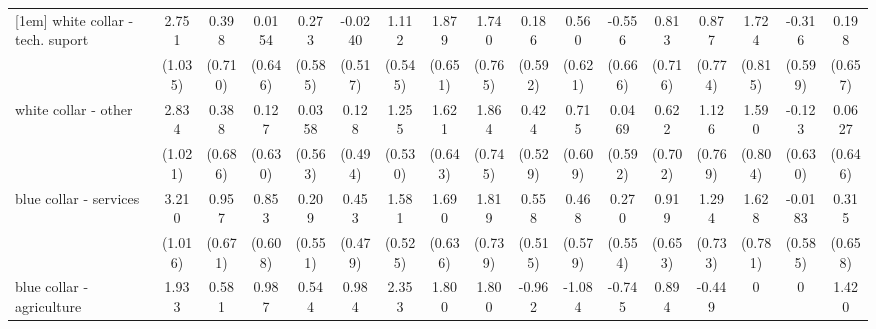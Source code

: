 {\begin{tabular}{l*{16}{c}}
[1em]
white collar - tech. suport&       2.751\sym{**} &       0.398         &      0.0154         &       0.273         &     -0.0240         &       1.112\sym{*}  &       1.879\sym{**} &       1.740\sym{*}  &       0.186         &       0.560         &      -0.556         &       0.813         &       0.877         &       1.724\sym{*}  &      -0.316         &       0.198         \\
                    &     (1.035)         &     (0.710)         &     (0.646)         &     (0.585)         &     (0.517)         &     (0.545)         &     (0.651)         &     (0.765)         &     (0.592)         &     (0.621)         &     (0.666)         &     (0.716)         &     (0.774)         &     (0.815)         &     (0.599)         &     (0.657)         \\
[1em]
white collar - other&       2.834\sym{**} &       0.388         &       0.127         &      0.0358         &       0.128         &       1.255\sym{*}  &       1.621\sym{*}  &       1.864\sym{*}  &       0.424         &       0.715         &      0.0469         &       0.622         &       1.126         &       1.590\sym{*}  &      -0.123         &      0.0627         \\
                    &     (1.021)         &     (0.686)         &     (0.630)         &     (0.563)         &     (0.494)         &     (0.530)         &     (0.643)         &     (0.745)         &     (0.529)         &     (0.609)         &     (0.592)         &     (0.702)         &     (0.769)         &     (0.804)         &     (0.630)         &     (0.646)         \\
[1em]
blue collar - services&       3.210\sym{**} &       0.957         &       0.853         &       0.209         &       0.453         &       1.581\sym{**} &       1.690\sym{**} &       1.819\sym{*}  &       0.558         &       0.468         &       0.270         &       0.919         &       1.294         &       1.628\sym{*}  &     -0.0183         &       0.315         \\
                    &     (1.016)         &     (0.671)         &     (0.608)         &     (0.551)         &     (0.479)         &     (0.525)         &     (0.636)         &     (0.739)         &     (0.515)         &     (0.579)         &     (0.554)         &     (0.653)         &     (0.733)         &     (0.781)         &     (0.585)         &     (0.658)         \\
[1em]
blue collar - agriculture&       1.933         &       0.581         &       0.987         &       0.544         &       0.984         &       2.353\sym{***}&       1.800\sym{*}  &       1.800         &      -0.962         &      -1.084         &      -0.745         &       0.894         &      -0.449         &           0         &           0         &       1.420         \\

\end{tabular}}
